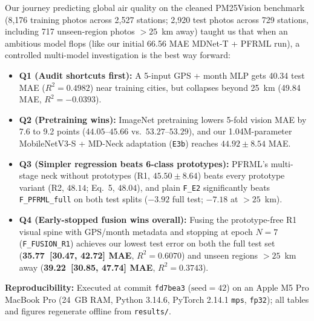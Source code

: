 \documentclass[conference]{IEEEtran}
\begin{document}
Our journey predicting global air quality on the cleaned PM25Vision benchmark
(8,176 training photos across 2,527 stations; 2,920 test photos across 729
stations, including 717 unseen-region photos $> 25$~km away) taught us that when
an ambitious model flops (like our initial 66.56 MAE MDNet-T + PFRML run), a
controlled multi-model investigation is the best way forward:
\begin{itemize}
  \item \textbf{Q1 (Audit shortcuts first):} A 5-input GPS + month MLP gets
        40.34 test MAE ($R^2 = 0.4982$) near training cities, but collapses
        beyond 25~km (49.84 MAE, $R^2 = -0.0393$).
  \item \textbf{Q2 (Pretraining wins):} ImageNet pretraining lowers 5-fold
        vision MAE by 7.6 to 9.2 points ($44.05\text{--}45.66$ vs.\
        $53.27\text{--}53.29$), and our 1.04M-parameter MobileNetV3-S + MD-Neck
        adaptation (\texttt{E3b}) reaches $44.92 \pm 8.54$ MAE.
  \item \textbf{Q3 (Simpler regression beats 6-class prototypes):} PFRML's
        multi-stage neck without prototypes (R1, $45.50 \pm 8.64$) beats every
        prototype variant (R2, $48.14$; Eq.~5, $48.04$), and plain
        \texttt{F\_E2} significantly beats \texttt{F\_PFRML\_full} on both test
        splits ($-3.92$ full test; $-7.18$ at $> 25$~km).
  \item \textbf{Q4 (Early-stopped fusion wins overall):} Fusing the
        prototype-free R1 visual spine with GPS/month metadata and stopping at
        epoch $N = 7$ (\texttt{F\_FUSION\_R1}) achieves our lowest test error on
        both the full test set (\textbf{35.77~[30.47, 42.72] MAE},
        $R^2 = 0.6070$) and unseen regions $> 25$~km away (\textbf{39.22~[30.85,
        47.74] MAE}, $R^2 = 0.3743$).
\end{itemize}

\textbf{Reproducibility:} Executed at commit \texttt{fd7bea3}
($\text{seed} = 42$) on an Apple M5 Pro MacBook Pro (24~GB RAM, Python 3.14.6,
PyTorch 2.14.1 \texttt{mps}, \texttt{fp32}); all tables and figures regenerate
offline from \texttt{results/}.



\end{document}
